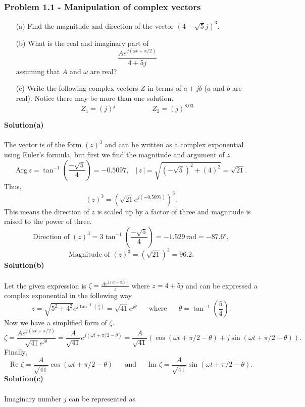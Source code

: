 \documentclass[12pt,a4paper]{article}
\begin{document}
\subsubsection*{Problem 1.1 - Manipulation of complex vectors}
\begin{enumerate}
    \item[(a)]Find the magnitude and direction of the vector $\left(4-\sqrt{5}j\right)^3$. 
    \item[(b)]What is the real and imaginary part of
    \[\frac{Ae^{j(\omega t+\pi/2)}}{4+5j}\]
    assuming that $A$ and $\omega$ are real?
    \item[(c)]Write the following complex vectors $Z$ in terms of $a+jb$ ($a$ and $b$ are real). Notice there may be more than one solution. 
    \[Z_1=(j)^j\,\,\,\,\,\,\,\,\,\,\,\,\,\,\,\,\,\,\,\,\,\,\,\,\,\,\,\,\,\,\,Z_2=(j)^{8.03}\]
\end{enumerate}
\textbf{Solution(a)}
\\
\\The vector is of the form $(z)^3$ and can be written as a complex exponential using Euler's formula, but first we find the magnitude and argument of $z$.
\[\text{Arg}\,z=\tan^{-1}\left(\frac{-\sqrt{5}}{4}\right)=-0.5097,\,\,\,\,\,|\,z\,|=\sqrt{(-\sqrt{5})^2+(4)^2}=\sqrt{21}.\]
Thus,
\[(z)^3=\left(\sqrt{21}e^{j(-0.5097)}\right)^3.\]
This means the direction of $z$ is scaled up by a factor of three and magnitude is raised to the power of three.
\[\text{Direction of }(z)^3=3\tan^{-1}\left(\frac{-\sqrt{5}}{4}\right)=-1.529\,\text{rad}=-87.6\text{°},\]
\[\text{Magnitude of }(z)^3=\left(\sqrt{21}\right)^3=96.2.\]
\textbf{Solution(b)}
\\
\\Let the given expression is $\zeta=\frac{Ae^{j(\omega t+\pi/2)}}{z}$ where $z=4+5j$ and can be expressed a complex exponential in the following way
\[z=\sqrt{5^2+4^2}e^{j\tan^{-1}\left(\frac{5}{4}\right)}=\sqrt{41}e^{j\theta}\,\,\,\,\,\,\,\,\,\,\text{where}\,\,\,\,\,\,\,\,\,\,\theta=\tan^{-1}\left(\frac{5}{4}\right).\]
Now we have a simplified form of $\zeta$.
\[\zeta=\frac{Ae^{j(\omega t+\pi/2)}}{\sqrt{41}e^{j\theta}}=\frac{A}{\sqrt{41}}e^{j(\omega t+\pi/2-\theta)}=\frac{A}{\sqrt{41}}(\cos(\omega t+\pi/2-\theta)+j\sin(\omega t+\pi/2-\theta)).\]
Finally,
\[\text{Re }\zeta=\frac{A}{\sqrt{41}}\cos(\omega t+\pi/2-\theta)\,\,\,\,\,\,\,\,\,\,\text{and}\,\,\,\,\,\,\,\,\,\,\text{Im }\zeta=\frac{A}{\sqrt{41}}\sin(\omega t+\pi/2-\theta).\]
\newpage
\textbf{Solution(c)}
\\
\\Imaginary number $j$ can be represented as
\end{document}
